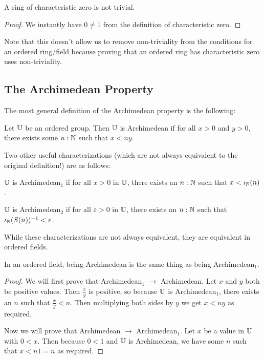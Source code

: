 \documentclass[../math.tex]{subfiles}
\begin{document}
\begin{instance}
    A ring of characteristic zero is not trivial.
\end{instance}
\begin{proof}
    We instantly have $0 \neq 1$ from the definition of characteristic zero.
\end{proof}
\noindent Note that this doesn't allow us to remove non-triviality from the
conditions for an ordered ring/field because proving that an ordered ring has
characteristic zero uses non-triviality.

\subsection{The Archimedean Property}

The most general definition of the Archimedean property is the following:

\begin{class}
    Let $\mathbb{U}$ be an ordered group.  Then $\mathbb{U}$ is Archimedean if for all $x > 0$
    and $y > 0$, there exists some $n : \mathbb{N}$ such that $x < ny$.
\end{class}

Two other useful characterizations (which are not always equivalent to the
original definition!) are as follows:

\begin{definition}
    $\mathbb{U}$ is Archimedean$_1$ if for all $x > 0$ in $\mathbb{U}$, there exists an $n : \mathbb{N}$
    such that $x < \iota_{\mathbb{N}}(n)$.
\end{definition}

\begin{definition}
    $\mathbb{U}$ is Archimedean$_2$ if for all $\varepsilon > 0$ in $\mathbb{U}$, there exists
    an $n : \mathbb{N}$ such that $\iota_{\mathbb{N}}(S(n))^{-1} < \varepsilon$.
\end{definition}

While these characterizations are not always equivalent, they are equivalent in
ordered fields.

\begin{theorem}
    In an ordered field, being Archimedean is the same thing as being
    Archimedean$_1$.
\end{theorem}
\begin{proof}
    We will first prove that Archimedean$_1$ $\rightarrow$ Archimedean.  Let $x$
    and $y$ both be positive values.  Then $\frac{x}{y}$ is positive, so because
    $\mathbb{U}$ is Archimedean$_1$, there exists an $n$ such that $\frac{x}{y} < n$.
    Then multiplying both sides by $y$ we get $x < ny$ as required.

    Now we will prove that Archimedean $\rightarrow$ Archimedean$_1$.  Let $x$
    be a value in $\mathbb{U}$ with $0 < x$.  Then because $0 < 1$ and $\mathbb{U}$ is
    Archimedean, we have some $n$ such that $x < n1 = n$ as required.
\end{proof}
\end{document}
